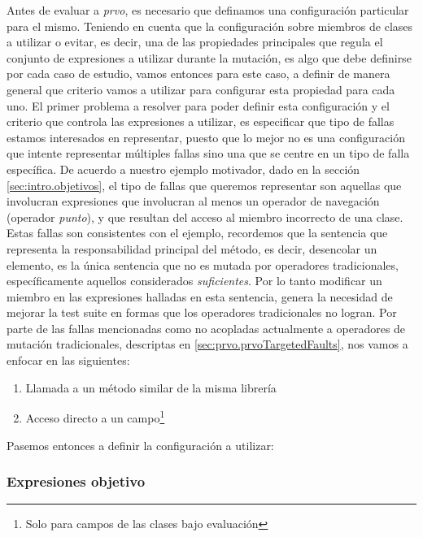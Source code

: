 Antes de evaluar a \emph{prvo}, es necesario que definamos una configuraci\'on particular para el mismo. Teniendo en cuenta que la configuraci\'on sobre miembros de clases a utilizar o evitar, es decir, una de las propiedades principales que regula el conjunto de expresiones a utilizar durante la mutaci\'on, es algo que debe definirse por cada caso de estudio, vamos entonces para este caso, a definir de manera general que criterio vamos a utilizar para configurar esta propiedad para cada uno. El primer problema a resolver para poder definir esta configuraci\'on y el criterio que controla las expresiones a utilizar, es especificar que tipo de fallas estamos interesados en representar, puesto que lo mejor no es una configuraci\'on que intente representar m\'ultiples fallas sino una que se centre en un tipo de falla espec\'ifica. De acuerdo a nuestro ejemplo motivador, dado en la secci\'on \ref{sec:intro.objetivos}, el tipo de fallas que queremos representar son aquellas que involucran expresiones que involucran al menos un operador de navegaci\'on (operador \emph{punto}), y que resultan del acceso al miembro incorrecto de una clase. Estas fallas son consistentes con el ejemplo, recordemos que la sentencia que representa la responsabilidad principal del m\'etodo, es decir, desencolar un elemento, es la \'unica sentencia que no es mutada por operadores tradicionales, espec\'ificamente aquellos considerados \emph{suficientes}. Por lo tanto modificar un miembro en las expresiones halladas en esta sentencia, genera la necesidad de mejorar la test suite en formas que los operadores tradicionales no logran. Por parte de las fallas mencionadas como no acopladas actualmente a operadores de mutaci\'on tradicionales, descriptas en \ref{sec:prvo.prvoTargetedFaults}, nos vamos a enfocar en las siguientes:

\begin{enumerate}[label=\arabic*), leftmargin=.75cm,align=left]
	\item Llamada a un m\'etodo similar de la misma librer\'ia
	\item Acceso directo a un campo\footnote{Solo para campos de las clases bajo evaluaci\'on}
\end{enumerate}

Pasemos entonces a definir la configuraci\'on a utilizar:

\subsubsection{Expresiones objetivo}

